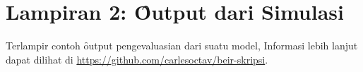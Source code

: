 
\chapter*{Lampiran 2: \f{Output} dari Simulasi}
\label{appendix:output}
Terlampir contoh \f{output} pengevaluasian dari suatu model, Informasi lebih lanjut dapat dilihat di \url{https://github.com/carlesoctav/beir-skripsi}.

